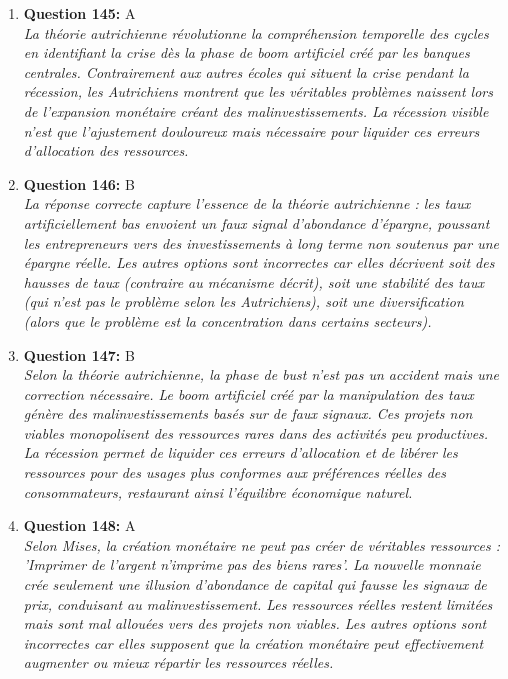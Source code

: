 \documentclass[12pt,a4paper]{article}
\begin{document}
\begin{enumerate}
\item \textbf{Question 145:} A
\\ \textit{La théorie autrichienne révolutionne la compréhension temporelle des cycles en identifiant la crise dès la phase de boom artificiel créé par les banques centrales. Contrairement aux autres écoles qui situent la crise pendant la récession, les Autrichiens montrent que les véritables problèmes naissent lors de l'expansion monétaire créant des malinvestissements. La récession visible n'est que l'ajustement douloureux mais nécessaire pour liquider ces erreurs d'allocation des ressources.}

\item \textbf{Question 146:} B
\\ \textit{La réponse correcte capture l'essence de la théorie autrichienne : les taux artificiellement bas envoient un faux signal d'abondance d'épargne, poussant les entrepreneurs vers des investissements à long terme non soutenus par une épargne réelle. Les autres options sont incorrectes car elles décrivent soit des hausses de taux (contraire au mécanisme décrit), soit une stabilité des taux (qui n'est pas le problème selon les Autrichiens), soit une diversification (alors que le problème est la concentration dans certains secteurs).}

\item \textbf{Question 147:} B
\\ \textit{Selon la théorie autrichienne, la phase de bust n'est pas un accident mais une correction nécessaire. Le boom artificiel créé par la manipulation des taux génère des malinvestissements basés sur de faux signaux. Ces projets non viables monopolisent des ressources rares dans des activités peu productives. La récession permet de liquider ces erreurs d'allocation et de libérer les ressources pour des usages plus conformes aux préférences réelles des consommateurs, restaurant ainsi l'équilibre économique naturel.}

\item \textbf{Question 148:} A
\\ \textit{Selon Mises, la création monétaire ne peut pas créer de véritables ressources : 'Imprimer de l'argent n'imprime pas des biens rares'. La nouvelle monnaie crée seulement une illusion d'abondance de capital qui fausse les signaux de prix, conduisant au malinvestissement. Les ressources réelles restent limitées mais sont mal allouées vers des projets non viables. Les autres options sont incorrectes car elles supposent que la création monétaire peut effectivement augmenter ou mieux répartir les ressources réelles.}


\end{enumerate}
\end{document}
